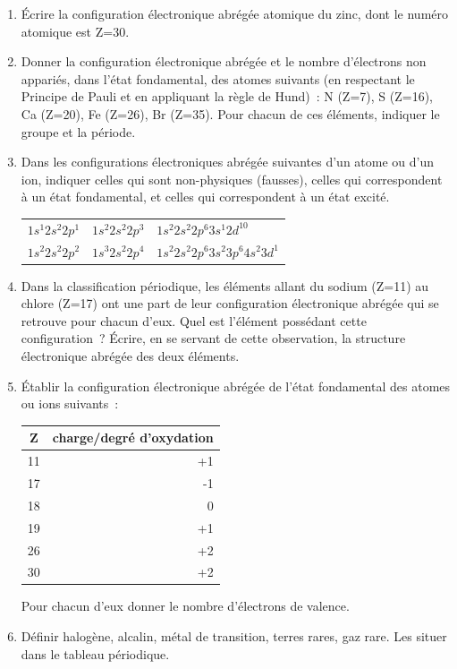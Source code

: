 \begin{enumerate}[\bf 1)]
\item \'Ecrire la configuration \'electronique abrégée atomique du zinc, dont le num\'ero 
atomique est Z=30.

\item Donner la configuration \'electronique abrégée et le nombre d'\'electrons non 
appari\'es, dans l'\'etat fondamental, des atomes suivants (en respectant le 
Principe de Pauli et en appliquant la r\`egle de Hund)~: N (Z=7), S (Z=16), 
Ca (Z=20), Fe (Z=26), Br (Z=35).
Pour chacun de ces éléments, indiquer le groupe et la période.

\item Dans les configurations \'electroniques abrégée suivantes d'un atome ou d'un ion, 
indiquer celles qui sont non-physiques (fausses), celles qui correspondent 
\`a un \'etat fondamental, et celles qui correspondent \`a un \'etat excit\'e.

\begin{center}
\begin{tabular}{lll}
$1s^1 2s^2 2p^1$ & $1s^2 2s^2 2p^3$ & $1s^2 2s^2 2p^6 3s^1 2d^{10}$         \\
$1s^2 2s^2 2p^2$ & $1s^3 2s^2 2p^4$ & $1s^2 2s^2 2p^6 3s^2 3p^6 4s^2 3d^1$  \\
\end{tabular}
\end{center}

\item Dans la classification p\'eriodique, les \'el\'ements allant du sodium 
(Z=11) au chlore (Z=17) ont une part de leur configuration \'electronique abrégée qui 
se retrouve pour chacun d'eux. Quel est l'\'el\'ement poss\'edant cette 
configuration~?  \'Ecrire, en se servant de cette observation, la structure 
\'electronique abrégée des deux \'el\'ements.

\item \'Etablir la configuration \'electronique abrégée de l'\'etat fondamental 
des atomes ou ions suivants~:

\begin{center}
\begin{tabular}{c|r}\hline
Z & charge/degré d'oxydation \\\hline
11 & +1 \\\hline
17 & -1 \\\hline
18 & 0  \\\hline
19 & +1 \\\hline
26 & +2 \\\hline
30 & +2 \\\hline
\end{tabular}
\end{center}

Pour chacun d'eux donner le nombre d'\'electrons de valence.

\item D\'efinir halog\`ene, alcalin, m\'etal de transition, terres rares, gaz rare. 
Les situer dans le tableau p\'eriodique.

\end{enumerate}
